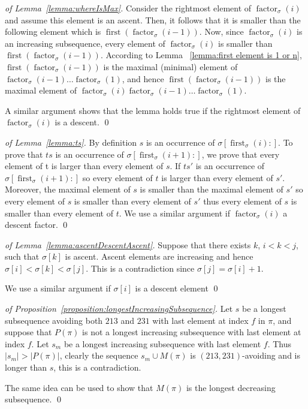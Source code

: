 \documentclass[a4paper]{llncs}
\newcommand{\pmotif}{\sigma}
\DeclareMathOperator{\firstia}{first}
\newcommand{\firsti}[2]{\firstia_{{#1}}({#2})}
\DeclareMathOperator{\factora}{factor}
\newcommand{\factor}[2]{\factora_{{#1}}({#2})}
\DeclareMathOperator{\firsta}{first}
\newcommand{\first}[2]{\firsta(\factor{#1}{#2})}
\begin{document}
\begin{proof}[of Lemma~\ref{lemma:whereIsMax}]
Consider the rightmost element of $\factor{\sigma}{i}$ and assume this element is an ascent.
Then, it follows that it is smaller than the following element which is $\first{\sigma}{i-1}$.
Now, since $\factor{\sigma}{i}$ is an increasing subsequence, every element of
$\factor{\sigma}{i}$ is smaller than $\first{\sigma}{i-1}$.
According to Lemma~
\ref{lemma:first element is 1 or n}, $\first{\sigma}{i-1}$ is 
the maximal (minimal) element of $\factor{\sigma}{i-1}\ldots\factor{\sigma}{1}$, 
and hence
$\first{\sigma}{i-1}$ is the maximal  element of
$\factor{\sigma}{i}\factor{\sigma}{i-1}\ldots\factor{\sigma}{1}$.

A similar argument shows that the lemma holds true if the rightmost element
of $\factor{\sigma}{i}$ is a descent.
\qed
\end{proof}

\bigskip

\begin{proof}[of Lemma~\ref{lemma:ts}]
By definition $s$ is an occurrence of $\pmotif[\firsti{\pmotif}{i}:]$. 
To prove that $ts$ is an occurrence of $\pmotif[\firsti{\pmotif}{i+1}:]$,
we prove that every element of t is larger than every element of $s$. 
If $ts'$ is an occurrence of $\pmotif[\firsti{\pmotif}{i+1}:]$ so every element of $t$ 
is larger than every element of $s'$. 
Moreover, the maximal element of $s$ is smaller than  the maximal element of $s'$ 
so every element of $s$ is smaller than every element of $s'$ thus every 
element of $s$ is smaller than every element of $t$. We use a similar argument 
if $\factor{\pmotif}{i}$ a descent factor.
\qed
\end{proof}

\bigskip

\begin{proof}[of Lemma~\ref{lemma:ascentDescentAscent}]
Suppose that there exists $k$, $i<k<j$,
such that $\pmotif[k]$ is ascent. 
Ascent elements are increasing and hence $\sigma[i]<\sigma[k]<\sigma[j]$.
This is a contradiction since $\sigma[j]=\sigma[i]+1$.

We use a similar argument if $\sigma[i]$ is a descent element
\qed
\end{proof}

\bigskip

\begin{proof}[of Proposition~\ref{proposition:longestIncreasingSubsequence}]
Let $s$ be a longest subsequence avoiding both $213$ and $231$ 
with last element at index $f$ in $\pi$,
and
suppose that $P(\pi)$ is not a longest increasing subsequence
with last element at index $f$. 
Let $s_m$ be a longest increasing subsequence with last element $f$.
Thus $|s_m|>|P(\pi)|$, clearly the sequence $s_m \cup M(\pi)$
is $(213,231)$-avoiding and is longer than $s$, this is a contradiction.

The same idea can be used to show that $M(\pi)$ is the longest decreasing 
subsequence.
\qed
\end{proof}
\end{document}
